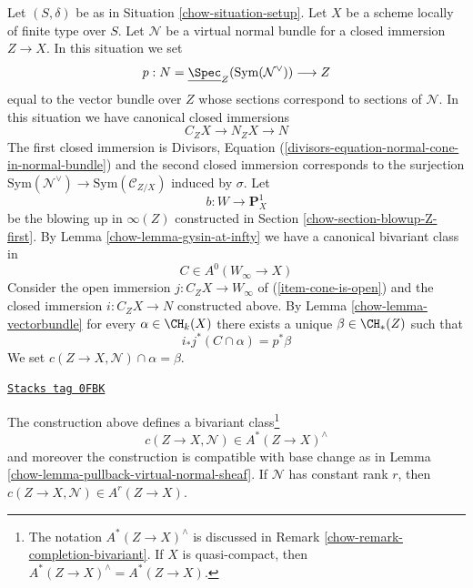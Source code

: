 Let $(S, \delta)$ be as in Situation \ref{chow-situation-setup}. Let $X$ be a scheme
locally of finite type over $S$. Let $\mathcal{N}$ be a virtual normal bundle
for a closed immersion $Z \to X$. In this situation we set
$$
p : N = \underline{\Spec}_Z(\text{Sym}(\mathcal{N}^\vee)) \longrightarrow Z
$$
equal to the vector bundle over $Z$
whose sections correspond to sections of $\mathcal{N}$.
In this situation we have canonical closed immersions
$$
C_ZX \longrightarrow N_ZX \longrightarrow N
$$
The first closed immersion is Divisors, Equation
(\ref{divisors-equation-normal-cone-in-normal-bundle})
and the second closed immersion corresponds to the surjection
$\text{Sym}(\mathcal{N}^\vee) \to \text{Sym}(\mathcal{C}_{Z/X})$
induced by $\sigma$.
Let
$$
b : W \longrightarrow \mathbf{P}^1_X
$$
be the blowing up in $\infty(Z)$ constructed in
Section \ref{chow-section-blowup-Z-first}. By
Lemma \ref{chow-lemma-gysin-at-infty}
we have a canonical bivariant class in
$$
C \in A^0(W_\infty \to X)
$$
Consider the open immersion $j : C_ZX \to W_\infty$ of
(\ref{item-cone-is-open}) and the closed immersion
$i : C_ZX \to N$ constructed above. By Lemma \ref{chow-lemma-vectorbundle}
for every $\alpha \in \CH_k(X)$ there exists a unique
$\beta \in \CH_*(Z)$ such that
$$
i_*j^*(C \cap \alpha) = p^*\beta
$$
We set $c(Z \to X, \mathcal{N}) \cap \alpha = \beta$.

\begin{lemma}
\label{chow-lemma-construction-gysin}
\href{https://stacks.math.columbia.edu/tag/0FBK}{\texttt{Stacks tag 0FBK}}

The construction above defines a bivariant class\footnote{The
notation $A^*(Z \to X)^\wedge$ is discussed in
Remark \ref{chow-remark-completion-bivariant}.
If $X$ is quasi-compact, then $A^*(Z \to X)^\wedge = A^*(Z \to X)$.}
$$
c(Z \to X, \mathcal{N}) \in A^*(Z \to X)^\wedge
$$
and moreover the construction is compatible with base change
as in Lemma \ref{chow-lemma-pullback-virtual-normal-sheaf}.
If $\mathcal{N}$ has constant rank $r$, then
$c(Z \to X, \mathcal{N}) \in A^r(Z \to X)$.
\end{lemma}

